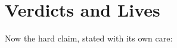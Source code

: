 \section{Verdicts and Lives}
\label{sec:explainer:verdicts-lives}

Now the hard claim, stated with its own care:
\par
